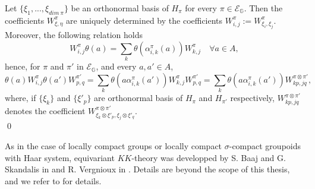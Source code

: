 \begin{dem}
Let $\{\xi_1,...,\xi_{dim\ \pi}\}$ be an orthonormal basis of $H_\pi$ for every $\pi\in\mathcal E_{\mathbb G}$. Then the coefficients $W_{\xi,\eta}^\pi$ are uniquely determined by the coefficients $W_{i,j}^\pi := W_{\xi_i,\xi_j}^\pi$. Moreover, the following relation holds
\[W_{i,j}^\pi \theta(a)= \sum_k \theta(\alpha_{i,k}^\pi(a)) W_{k,j}^\pi \quad \forall a\in A,\]
hence, for $\pi$ and $\pi'$ in $\mathcal E_{\mathbb G}$, and every $a,a'\in A$,
\[\theta(a) W_{i,j}^\pi \theta(a')W_{p,q}^{\pi'} = \sum_k \theta(a \alpha_{i,k}^{\pi}(a')) W_{k,j}^\pi W_{p,q}^{\pi'} 
= \sum_k \theta(a \alpha_{i,k}^{\pi}(a')) W_{kp,jq}^{\pi\otimes \pi'}, \]
where, if $\{\xi_k\}$ and $\{\xi'_p\}$ are orthonormal basis of $H_\pi$ and $H_{\pi'}$ respectively, $W_{kp,jq}^{\pi\otimes \pi'}$ denotes the coefficient $W_{\xi_k\otimes \xi'_p,\xi_j \otimes \xi'_q}^{\pi\otimes \pi'}$.\\
\qed
\end{dem}

As in the case of locally compact groups or locally compact $\sigma$-compact groupoids with Haar system, equivariant $KK$-theory was developped by S. Baaj and G. Skandalis in \cite{BaajSk} and R. Vergnioux in \cite{vergnioux}. Details are beyond the scope of this thesis, and we refer to \cite{vergnioux} for details.\\


